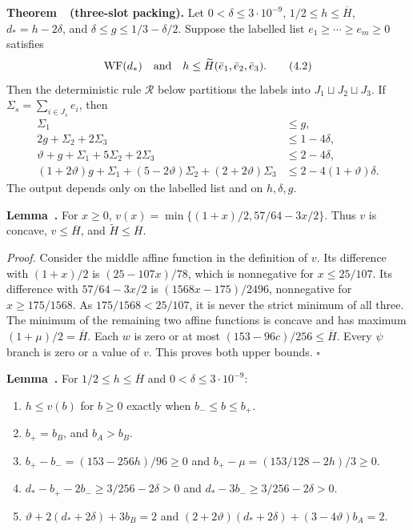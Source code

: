 \textbf{Theorem~\thetheorem\ (three-slot packing).}\label{thm:pack-a}
Let $0<\delta\le3\cdot10^{-9}$,
$1/2\le h\le\overline H$, $d_*=h-2\delta$, and
$\delta\le g\le1/3-\delta/2$. Suppose the labelled list
$e_1\ge\cdots\ge e_m\ge0$ satisfies
\[
 \mathrm{WF}(d_*)\quad\hbox{and}\quad
 h\le\widetilde H(\bar e_1,\bar e_2,\bar e_3).
 \tag{4.2}\label{eq:pack-hypotheses}
\]
Then the deterministic rule $\mathcal R$ below partitions the labels
into $J_1\sqcup J_2\sqcup J_3$. If
$\Sigma_s=\sum_{i\in J_s}e_i$, then
\[
\begin{aligned}
 \Sigma_1&\le g,\\
 2g+\Sigma_2+2\Sigma_3&\le1-4\delta,\\
 \vartheta+g+\Sigma_1+5\Sigma_2+2\Sigma_3&\le2-4\delta,\\
 (1+2\vartheta)g+\Sigma_1+(5-2\vartheta)\Sigma_2
       +(2+2\vartheta)\Sigma_3&\le2-4(1+\vartheta)\delta.
\end{aligned}
 \tag{4.3}\label{eq:pack-loads}
\]
The output depends only on the labelled list and on $h,\delta,g$.

\label{lem:pack-1}\textbf{Lemma~\thetheorem.} For $x\ge0$,
$v(x)=\min\{(1+x)/2,57/64-3x/2\}$. Thus $v$ is concave,
$v\le\overline H$, and $\widetilde H\le\overline H$.

\emph{Proof.} Consider the middle affine function in the definition
of $v$. Its difference with $(1+x)/2$ is $(25-107x)/78$, which is
nonnegative for $x\le25/107$. Its difference with $57/64-3x/2$ is
$(1568x-175)/2496$, nonnegative for $x\ge175/1568$.
As $175/1568<25/107$, it is never the strict minimum of all three.
The minimum of the remaining two affine functions is concave and has
maximum $(1+\mu)/2=\overline H$. Each $w$ is zero or at most
$(153-96c)/256\le\overline H$. Every $\psi$ branch is zero or a value
of $v$. This proves both upper bounds. \hfill$\square$

\label{lem:pack-2}\textbf{Lemma~\thetheorem.} For $1/2\le h\le\overline H$ and
$0<\delta\le3\cdot10^{-9}$:
\begin{enumerate}
\item $h\le v(b)$ for $b\ge0$ exactly when $b_-\le b\le b_+$.
\item $b_+=b_B$, and $b_A>b_B$.
\item $b_+-b_-=(153-256h)/96\ge0$ and
      $b_+-\mu=(153/128-2h)/3\ge0$.
\item $d_*-b_+-2b_-\ge3/256-2\delta>0$ and
      $d_*-3b_-\ge3/256-2\delta>0$.
\item $\vartheta+2(d_*+2\delta)+3b_B=2$ and
      $(2+2\vartheta)(d_*+2\delta)+(3-4\vartheta)b_A=2$.
\end{enumerate}

